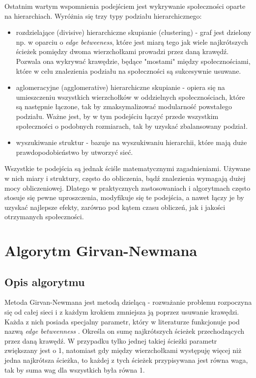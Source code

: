 \documentclass{article}
\begin{document}
Ostatnim wartym wspomnienia podejściem jest wykrywanie społeczności oparte na hierarchiach. Wyróżnia się trzy typy podziału hierarchicznego:
\begin{itemize}
\item rozdzielające (divisive) hierarchiczne skupianie (clustering) - graf jest dzielony np. w oparciu o \textit{edge betweeness}, które jest miarą tego jak wiele najkrótszych ścieżek pomiędzy dwoma wierzchołkami prowadzi przez daną krawędź. Pozwala ona wykrywać krawędzie, będące "mostami" między społecznościami, które w celu znalezienia podziału na społeczności są sukcesywnie usuwane.
\item aglomeracyjne (agglomerative) hierarchiczne skupianie - opiera się na umieszczeniu wszystkich wierzchołków w oddzielnych społecznościach, które są następnie łączone, tak by zmaksymalizować modularność powstałego podziału. Ważne jest, by w tym podejściu łączyć przede wszystkim społeczności o podobnych rozmiarach, tak by uzyskać zbalansowany podział.
\item wyszukiwanie struktur - bazuje na wyszukiwaniu hierarchii, które mają duże prawdopodobieństwo by utworzyć sieć.
\end{itemize}

Wszystkie te podejścia są jednak ściśle matematycznymi zagadnieniami. Używane w nich miary i struktury, często do obliczenia, bądź znalezienia wymagają dużej mocy obliczeniowej\cite{pw-paper1}. Dlatego w praktycznych zastosowaniach i algorytmach często stosuje się pewne uproszczenia, modyfikuje się te podejścia, a nawet łączy je by uzyskać najlepsze efekty, zarówno pod kątem czasu obliczeń, jak i jakości otrzymanych społeczności.
\newpage
\section{Algorytm Girvan-Newmana}
\subsection{Opis algorytmu}
Metoda Girvan-Newmana jest metodą dzielącą - rozważanie problemu rozpoczyna się od całej sieci i z każdym krokiem zmniejsza ją poprzez usuwanie krawędzi. Każda z nich posiada specjalny parametr, który w literaturze funkcjonuje pod nazwą \textit{edge betweenness} \cite{is-paper1}. Określa on sumę najkrótszych ścieżek przechodzących przez daną krawędź. W przypadku tylko jednej takiej ścieżki parametr zwiększany jest o 1, natomiast gdy między wierzchołkami występuję więcej niż jedna najkrótsza ścieżka, to każdej z tych ścieżek przypisywana jest równa waga, tak by suma wag dla wszystkich była równa 1.\\
\end{document}
